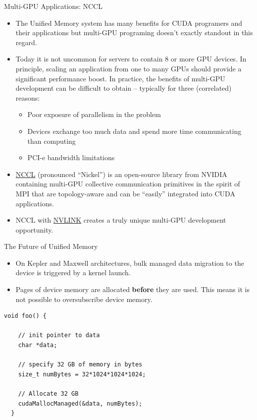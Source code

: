 \documentclass{beamer}
\begin{document}
\begin{frame}{Multi-GPU Applications: NCCL}
\begin{itemize}
    \item<1->The Unified Memory system has many benefits for CUDA programers and their applications but multi-GPU programing doesn't exactly standout in this regard.
    \item<1->Today it is not uncommon for servers to contain 8 or more GPU devices. In principle, scaling an application from one to many GPUs should provide a significant performance boost. In practice, the benefits of multi-GPU development can be difficult to obtain -- typically for three (correlated) reasons:
    \begin{itemize}
        \item<1->Poor exposure of parallelism in the problem
        \item<1->Devices exchange too much data and spend more time communicating than computing
        \item<1->PCI-e bandwidth limitations
    \end{itemize}
    \item<1->\href{https://devblogs.nvidia.com/parallelforall/fast-multi-gpu-collectives-nccl/}{\color{blue}NCCL} (pronounced ``Nickel'') is an open-source library from NVIDIA containing multi-GPU collective communication primitives in the spirit of MPI that are topology-aware and can be ``easily'' integrated into CUDA applications.
    \item<1->NCCL with \href{http://www.nvidia.com/object/nvlink.html}{\color{blue}NVLINK} creates a truly unique multi-GPU development opportunity.
\end{itemize}
\end{frame}

\begin{frame}[fragile]{The Future of Unified Memory}
\begin{itemize}
	\item<1->On Kepler and Maxwell architectures, bulk managed data migration to the device is triggered by a kernel launch.
	\item<1->Pages of device memory are allocated \textbf{before} they are used.  This means it is not possible to oversubscribe device memory.
\end{itemize}
\begin{lstlisting}[caption={Fails on Kepler and Maxwell}]
  void foo() {
  
    // init pointer to data
    char *data;
  
    // specify 32 GB of memory in bytes
    size_t numBytes = 32*1024*1024*1024; 
  
    // Allocate 32 GB
    cudaMallocManaged(&data, numBytes);
  }
\end{lstlisting}
\end{frame}
\end{document}
